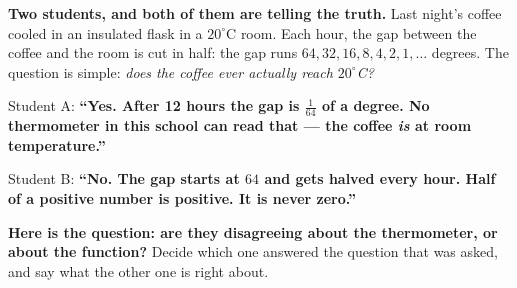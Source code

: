 \documentclass[10pt]{article}
\begin{document}
\vspace{0.10in}

\boxguard[12]
\begin{hookbox}
\small
\textbf{Two students, and both of them are telling the truth.} Last night's coffee cooled in an
insulated flask in a $20^\circ$C room. Each hour, the gap between the coffee and the room is cut in
half: the gap runs $64, 32, 16, 8, 4, 2, 1, \dots$ degrees. The question is simple:
\emph{does the coffee ever actually reach $20^\circ$C?}

\smallskip
Student A: \textbf{``Yes. After 12 hours the gap is $\tfrac{1}{64}$ of a degree. No thermometer in
this school can read that --- the coffee \emph{is} at room temperature.''}

\smallskip
Student B: \textbf{``No. The gap starts at $64$ and gets halved every hour. Half of a positive number
is positive. It is never zero.''}

\smallskip
\textbf{Here is the question: are they disagreeing about the thermometer, or about the function?}
Decide which one answered the question that was asked, and say what the other one is right about.

\\
\\
\end{hookbox}

\vspace{0.10in}
\end{document}
